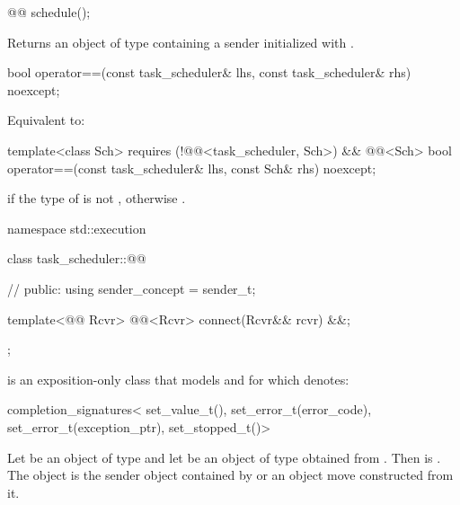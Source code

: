 %
\begin{itemdecl}
@@ schedule();
\end{itemdecl}
\begin{itemdescr}
\pnum
\effects
Returns an object of type  containing a sender
initialized with .
\end{itemdescr}

%
\begin{itemdecl}
bool operator==(const task_scheduler& lhs, const task_scheduler& rhs) noexcept;
\end{itemdecl}
\begin{itemdescr}
\pnum
\effects
Equivalent to: 
\end{itemdescr}

%
\begin{itemdecl}
template<class Sch>
  requires (!@@<task_scheduler, Sch>)
        && @@<Sch>
bool operator==(const task_scheduler& lhs, const Sch& rhs) noexcept;
\end{itemdecl}
\begin{itemdescr}
\pnum
\returns
{} if the type of  is not ,
otherwise .
\end{itemdescr}

\pnum
\begin{codeblock}
namespace std::execution {
  class task_scheduler::@@ {     // \expos
  public:
    using sender_concept = sender_t;

    template<@@ Rcvr>
      @@<Rcvr> connect(Rcvr&& rcvr) &&;
  };
}
\end{codeblock}
 is an exposition-only class that models
 and for which
 denotes:
\begin{codeblock}
completion_signatures<
  set_value_t(),
  set_error_t(error_code),
  set_error_t(exception_ptr),
  set_stopped_t()>
\end{codeblock}

\pnum
Let  be an object of type 
and let  be an object of type  obtained
from .
Then 
is .
The object  is the sender object contained by
 or an object move constructed from it.

